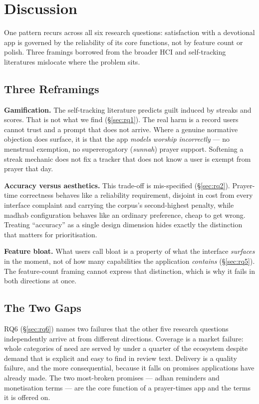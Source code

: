 
\section{Discussion}
\label{sec:discussion}

One pattern recurs across all six research questions: satisfaction with a
devotional app is governed by the reliability of its core functions, not by
feature count or polish. Three framings borrowed from the broader HCI and
self-tracking literatures mislocate where the problem sits.

\subsection{Three Reframings}

\textbf{Gamification.} The self-tracking literature predicts guilt induced by
streaks and scores. That is not what we find (\S\ref{sec:rq1}). The real harm
is a record users cannot trust and a prompt that does not arrive. Where a
genuine normative objection does surface, it is that the app \emph{models
worship incorrectly} --- no menstrual exemption, no supererogatory
(\emph{sunnah}) prayer support. Softening a streak mechanic does not fix a
tracker that does not know a user is exempt from prayer that day.

\textbf{Accuracy versus aesthetics.} This trade-off is mis-specified
(\S\ref{sec:rq2}). Prayer-time correctness behaves like a reliability
requirement, disjoint in cost from every interface complaint and carrying the
corpus's second-highest penalty, while madhab configuration behaves like an
ordinary preference, cheap to get wrong. Treating ``accuracy'' as a single
design dimension hides exactly the distinction that matters for
prioritisation.

\textbf{Feature bloat.} What users call bloat is a property of what the
interface \emph{surfaces} in the moment, not of how many capabilities the
application \emph{contains} (\S\ref{sec:rq5}). The feature-count framing
cannot express that distinction, which is why it fails in both directions at
once.

\subsection{The Two Gaps}

RQ6 (\S\ref{sec:rq6}) names two failures that the other five research
questions independently arrive at from different directions. Coverage is a
market failure: whole categories of need are served by under a quarter of the
ecosystem despite demand that is explicit and easy to find in review text.
Delivery is a quality failure, and the more consequential, because it falls
on promises applications have already made. The two most-broken promises ---
adhan reminders and monetisation terms --- are the core function of a
prayer-times app and the terms it is offered on.

